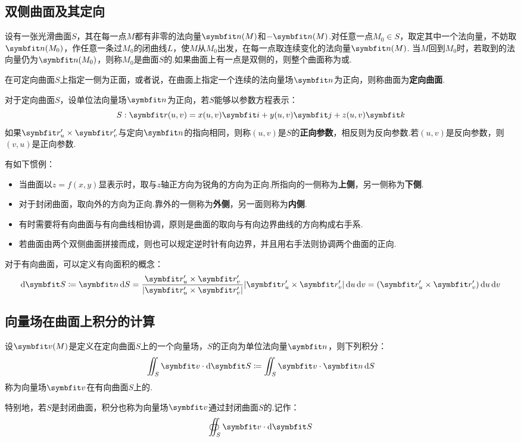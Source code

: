 \subsection{双侧曲面及其定向}
\begin{definition}
    设有一张光滑曲面$S$，其在每一点$M$都有非零的法向量$\vb{n}(M)$和$-\vb{n}(M)$.对任意一点$M_0\in S$，取定其中一个法向量，不妨取$\vb{n}(M_0)$，作任意一条过$M_0$的闭曲线$L$，使$M$从$M_0$出发，在每一点取连续变化的法向量$\vb{n}(M)$.
    当$M$回到$M_0$时，若取到的法向量仍为$\vb{n}(M_0)$，则称$M_0$是曲面$S$的.如果曲面上有一点是双侧的，则整个曲面称为或.
\end{definition}

\begin{definition}
    在可定向曲面$S$上指定一侧为正面，或者说，在曲面上指定一个连续的法向量场$\vb{n}$为正向，则称曲面为\textbf{定向曲面}.
\end{definition}

对于定向曲面$S$，设单位法向量场$\vb{n}$为正向，若$S$能够以参数方程表示：
\[S:\vb{r}(u,v) = x(u,v)\vb{i} + y(u,v)\vb{j} + z(u,v)\vb{k}\]
如果$\vb{r}'_u\times\vb{r}'_v$与定向$\vb{n}$的指向相同，则称$(u,v)$是$S$的\textbf{正向参数}，相反则为反向参数.若$(u,v)$是反向参数，则$(v,u)$是正向参数.

有如下惯例：
\begin{itemize}
    \item 当曲面以$z=f(x,y)$显表示时，取与$z$轴正方向为锐角的方向为正向.所指向的一侧称为\textbf{上侧}，另一侧称为\textbf{下侧}.
    \item 对于封闭曲面，取向外的方向为正向.靠外的一侧称为\textbf{外侧}，另一面则称为\textbf{内侧}.
    \item 有时需要将有向曲面与有向曲线相协调，原则是曲面的取向与有向边界曲线的方向构成右手系.
    \item 若曲面由两个双侧曲面拼接而成，则也可以规定逆时针有向边界，并且用右手法则协调两个曲面的正向.
\end{itemize}

对于有向曲面，可以定义有向面积的概念：
\[\dd{\vb{S}}\coloneq \vb{n}\dd{S} = \frac{\vb{r}'_u\times\vb{r}'_v}{|\vb{r}'_u\times\vb{r}'_v|}|\vb{r}'_u\times\vb{r}'_v|\dd{u}\dd{v} = (\vb{r}'_u\times\vb{r}'_v)\dd{u}\dd{v}\]


\subsection{向量场在曲面上积分的计算}
\begin{definition}
    设$\vb{v}(M)$是定义在定向曲面$S$上的一个向量场，$S$的正向为单位法向量$\vb{n}$，则下列积分：
    \[\iint_S \vb{v}\cdot\dd{\vb{S}} \coloneq \iint_S\vb{v}\cdot\vb{n}\dd{S}\]
    称为向量场$\vb{v}$在有向曲面$S$上的.

    特别地，若$S$是封闭曲面，积分也称为向量场$\vb{v}$通过封闭曲面$S$的.记作：
    \[\oiint_S \vb{v}\cdot\dd{\vb{S}}\]
\end{definition}

